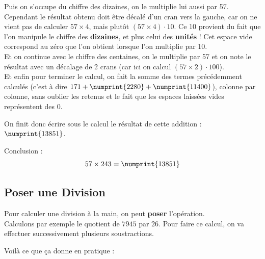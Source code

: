 \documentclass[a4paper, twoside]{article}
\begin{document}
			Puis on s'occupe du chiffre des dizaines, on le multiplie lui aussi par 57. 
			Cependant le résultat obtenu doit être décalé d'un cran vers la gauche, 
			car on ne vient pas de calculer $ 57 \times 4 $, mais plutôt $ (57 \times 4) \cdot 10$. 
			Ce 10 provient du fait que l'on manipule le chiffre des \textbf{dizaines}, 
			et plus celui des \textbf{unités} ! Cet espace vide correspond au zéro que l'on obtient lorsque l'on multiplie par 10.\\

			Et on continue avec le chiffre des centaines, 
			on le multiplie par 57 et on note le résultat 
			avec un décalage de 2 crans (car ici on calcul $(57 \times 2) \cdot 100$).\\

			Et enfin pour terminer le calcul, 
			on fait la somme des termes précédemment calculés (c'est à dire $ 171 + \numprint{2280} + \numprint{11400} $), 
			colonne par colonne, sans oublier les retenus et le fait que les espaces laissées vides représentent des 0.

			On finit donc écrire sous le calcul le résultat de cette addition : $\numprint{13851}$.\\

			\vfill

			Conclusion :
			{\large $$ 57 \times 243 = \numprint{13851}$$}

			\vfill

\newpage

		\subsection{Poser une Division}

			Pour calculer une division à la main, on peut \textbf{poser} l'opération.\\

			Calculons par exemple le quotient de $7945$ par $26$. 
			Pour faire ce calcul, on va effectuer successivement plusieurs soustractions.

			Voilà ce que ça donne en pratique :

			\doublespacing
\end{document}

